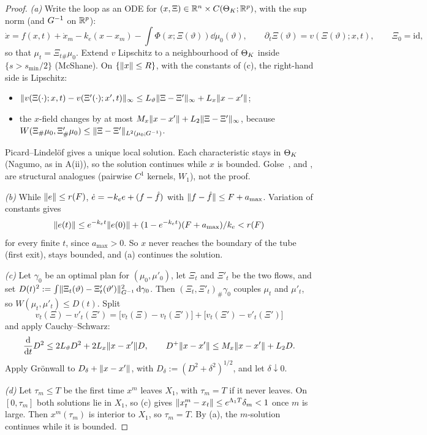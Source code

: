 \begin{proof}
\textit{(a)} Write the loop as an ODE for $(x,\Xi)\in\mathbb{R}^n\times C(\Theta_K;\mathbb{R}^p)$, with the sup norm (and $G^{-1}$ on
$\mathbb{R}^p$):
\[
  \dot x = f(x,t)+\dot x_m-k_e(x-x_m)-\int\Phi(x;\Xi(\vartheta))\dd\mu_0(\vartheta),\qquad
  \partial_t\Xi(\vartheta)=v(\Xi(\vartheta);x,t),\qquad \Xi_0=\mathrm{id},
\]
so that $\mu_t=\Xi_{t\#}\mu_0$. Extend $v$ Lipschitz to a neighbourhood of $\Theta_K$ inside $\{s>s_{\min}/2\}$
(McShane). On $\{\lVert x\rVert\le R\}$, with the constants of (c), the right-hand side is Lipschitz:
\begin{itemize}
\item $\lVert v(\Xi(\cdot);x,t)-v(\Xi'(\cdot);x',t)\rVert_\infty\le L_\vartheta\lVert \Xi-\Xi'\rVert_\infty+L_x\lVert x-x'\rVert$;
\item the $x$-field changes by at most $M_x\lVert x-x'\rVert+L_2\lVert \Xi-\Xi'\rVert_\infty$, because
  $W(\Xi_\#\mu_0,\Xi'_\#\mu_0)\le\lVert \Xi-\Xi'\rVert_{L^2(\mu_0;G^{-1})}$.
\end{itemize}
Picard--Lindelöf gives a unique local solution. Each characteristic stays in $\Theta_K$ (Nagumo, as in A(ii)), so the
solution continues while $x$ is bounded. Golse~\cite[Thms.~1.3.2 and~1.4.3]{R82}, and \cite{R77,R78,R79}, are
structural analogues (pairwise $C^1$ kernels, $W_1$), not the proof.

\textit{(b)} While $\lVert e\rVert\le r(F)$, $\dot e=-k_e e+(f-\hat f)$ with $\lVert f-\hat f\rVert\le F+a_{\max}$. Variation of
constants gives
\[
  \lVert e(t)\rVert\le e^{-k_e t}\lVert e(0)\rVert+(1-e^{-k_e t})(F+a_{\max})/k_e<r(F)
\]
for every finite $t$, since $a_{\max}>0$. So $x$ never reaches the boundary of the tube (first exit), stays bounded,
and (a) continues the solution.

\textit{(c)} Let $\gamma_0$ be an optimal plan for $(\mu_0,\mu'_0)$, let $\Xi_t$ and $\Xi'_t$ be the two flows, and
set $D(t)^2:=\int\lVert \Xi_t(\vartheta)-\Xi'_t(\vartheta')\rVert^2_{G^{-1}}\,\mathrm{d}\gamma_0$. Then $(\Xi_t,\Xi'_t)_\#\gamma_0$
couples $\mu_t$ and $\mu'_t$, so $W(\mu_t,\mu'_t)\le D(t)$. Split
\[
  v_t(\Xi)-v'_t(\Xi')=\bigl[v_t(\Xi)-v_t(\Xi')\bigr]+\bigl[v_t(\Xi')-v'_t(\Xi')\bigr]
\]
and apply Cauchy--Schwarz:
\[
  \frac{\mathrm d}{\mathrm dt}D^2\le2L_\vartheta D^2+2L_x\lVert x-x'\rVert D,\qquad
  D^+\lVert x-x'\rVert\le M_x\lVert x-x'\rVert+L_2D.
\]
Apply Grönwall to $D_\delta+\lVert x-x'\rVert$, with $D_\delta:=(D^2+\delta^2)^{1/2}$, and let $\delta\downarrow0$.

\textit{(d)} Let $\tau_m\le T$ be the first time $x^m$ leaves $X_1$, with $\tau_m=T$ if it never leaves. On
$[0,\tau_m]$ both solutions lie in $X_1$, so (c) gives $\lVert x^m_t-x_t\rVert\le e^{\Lambda_1T}\delta_m<1$ once $m$ is
large. Then $x^m(\tau_m)$ is interior to $X_1$, so $\tau_m=T$. By (a), the $m$-solution continues while it is bounded.


\end{proof}
